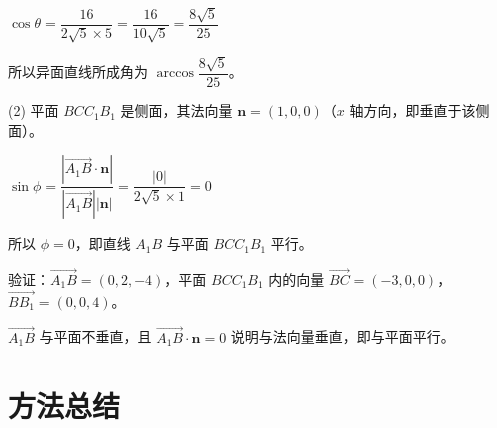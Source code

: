 \documentclass[11pt]{ctexrep}
\begin{document}
$\cos\theta = \dfrac{16}{2\sqrt{5} \times 5} = \dfrac{16}{10\sqrt{5}} = \dfrac{8\sqrt{5}}{25}$

所以异面直线所成角为 $\arccos\dfrac{8\sqrt{5}}{25}$。

(2) 平面 $BCC_1B_1$ 是侧面，其法向量 $\boldsymbol{n} = (1, 0, 0)$（$x$ 轴方向，即垂直于该侧面）。

$\sin\phi = \dfrac{|\overrightarrow{A_1B} \cdot \boldsymbol{n}|}{|\overrightarrow{A_1B}||\boldsymbol{n}|} = \dfrac{|0|}{2\sqrt{5} \times 1} = 0$

所以 $\phi = 0$，即直线 $A_1B$ 与平面 $BCC_1B_1$ 平行。

验证：$\overrightarrow{A_1B} = (0, 2, -4)$，平面 $BCC_1B_1$ 内的向量 $\overrightarrow{BC} = (-3, 0, 0)$，$\overrightarrow{BB_1} = (0, 0, 4)$。

$\overrightarrow{A_1B}$ 与平面不垂直，且 $\overrightarrow{A_1B} \cdot \boldsymbol{n} = 0$ 说明与法向量垂直，即与平面平行。

\section*{方法总结}
\end{document}
